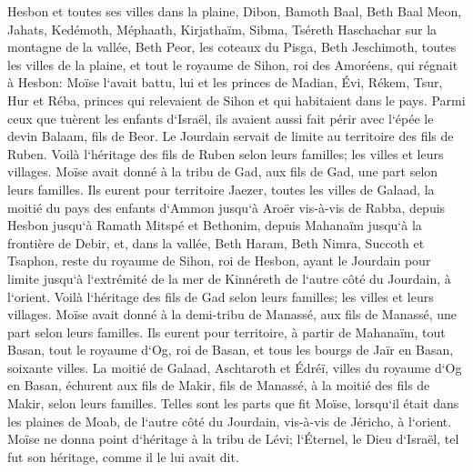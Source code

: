 \verse Hesbon et toutes ses villes dans la plaine, Dibon, Bamoth Baal, Beth Baal Meon, 
\verse Jahats, Kedémoth, Méphaath, 
\verse Kirjathaïm, Sibma, Tséreth Haschachar sur la montagne de la vallée, 
\verse Beth Peor, les coteaux du Pisga, Beth Jeschimoth, 
\verse toutes les villes de la plaine, et tout le royaume de Sihon, roi des Amoréens, qui régnait à Hesbon: Moïse l`avait battu, lui et les princes de Madian, Évi, Rékem, Tsur, Hur et Réba, princes qui relevaient de Sihon et qui habitaient dans le pays. 
\verse Parmi ceux que tuèrent les enfants d`Israël, ils avaient aussi fait périr avec l`épée le devin Balaam, fils de Beor. 
\verse Le Jourdain servait de limite au territoire des fils de Ruben. Voilà l`héritage des fils de Ruben selon leurs familles; les villes et leurs villages. 
\verse Moïse avait donné à la tribu de Gad, aux fils de Gad, une part selon leurs familles. 
\verse Ils eurent pour territoire Jaezer, toutes les villes de Galaad, la moitié du pays des enfants d`Ammon jusqu`à Aroër vis-à-vis de Rabba, 
\verse depuis Hesbon jusqu`à Ramath Mitspé et Bethonim, depuis Mahanaïm jusqu`à la frontière de Debir, 
\verse et, dans la vallée, Beth Haram, Beth Nimra, Succoth et Tsaphon, reste du royaume de Sihon, roi de Hesbon, ayant le Jourdain pour limite jusqu`à l`extrémité de la mer de Kinnéreth de l`autre côté du Jourdain, à l`orient. 
\verse Voilà l`héritage des fils de Gad selon leurs familles; les villes et leurs villages. 
\verse Moïse avait donné à la demi-tribu de Manassé, aux fils de Manassé, une part selon leurs familles. 
\verse Ils eurent pour territoire, à partir de Mahanaïm, tout Basan, tout le royaume d`Og, roi de Basan, et tous les bourgs de Jaïr en Basan, soixante villes. 
\verse La moitié de Galaad, Aschtaroth et Édréï, villes du royaume d`Og en Basan, échurent aux fils de Makir, fils de Manassé, à la moitié des fils de Makir, selon leurs familles. 
\verse Telles sont les parts que fit Moïse, lorsqu`il était dans les plaines de Moab, de l`autre côté du Jourdain, vis-à-vis de Jéricho, à l`orient. 
\verse Moïse ne donna point d`héritage à la tribu de Lévi; l`Éternel, le Dieu d`Israël, tel fut son héritage, comme il le lui avait dit. 

